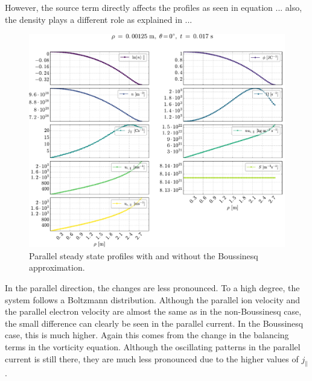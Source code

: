 However, the source term directly affects the profiles as seen in equation ...
also, the density plays a different role as explained in ...
%
\begin{figure}[htb]
    \centering
    \includegraphics[width=1.0\textwidth]{fig/results/compareBouss/1DProfPar001B}
    \caption{Parallel steady state profiles with and without the Boussinesq approximation.}
    \label{fig:compareBoussProfPar}
\end{figure}
%
In the parallel direction, the changes are less pronounced.
To a high degree, the system follows a Boltzmann distribution.
Although the parallel ion velocity and the parallel electron velocity are almost the same as in the non-Boussinesq case, the small difference can clearly be seen in the parallel current.
In the Boussinesq case, this is much higher.
Again this comes from the change in the balancing terms in the vorticity equation.
Although the oscillating patterns in the parallel current is still there, they are much less pronounced due to the higher values of $j_\|$.
%


